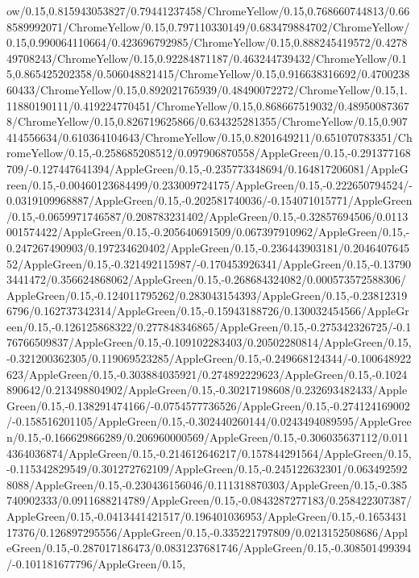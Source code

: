 {\begin{tikzternal}
{ow/0.15,0.815943053827/0.79441237458/ChromeYellow/0.15,0.768660744813/0.668589992071/ChromeYellow/0.15,0.797110330149/0.683479884702/ChromeYellow/0.15,0.990064110664/0.423696792985/ChromeYellow/0.15,0.888245419572/0.427849708243/ChromeYellow/0.15,0.92284871187/0.463244739432/ChromeYellow/0.15,0.865425202358/0.506048821415/ChromeYellow/0.15,0.916638316692/0.470023860433/ChromeYellow/0.15,0.892021765939/0.48490072272/ChromeYellow/0.15,1.11880190111/0.419224770451/ChromeYellow/0.15,0.868667519032/0.489500873678/ChromeYellow/0.15,0.826719625866/0.634325281355/ChromeYellow/0.15,0.907414556634/0.610364104643/ChromeYellow/0.15,0.8201649211/0.651070783351/ChromeYellow/0.15,-0.258685208512/0.097906870558/AppleGreen/0.15,-0.291377168709/-0.127447641394/AppleGreen/0.15,-0.235773348694/0.164817206081/AppleGreen/0.15,-0.00460123684499/0.233009724175/AppleGreen/0.15,-0.222650794524/-0.0319109968887/AppleGreen/0.15,-0.202581740036/-0.154071015771/AppleGreen/0.15,-0.0659971746587/0.208783231402/AppleGreen/0.15,-0.32857694506/0.0113001574422/AppleGreen/0.15,-0.205640691509/0.067397910962/AppleGreen/0.15,-0.247267490903/0.197234620402/AppleGreen/0.15,-0.236443903181/0.204640764552/AppleGreen/0.15,-0.321492115987/-0.170453926341/AppleGreen/0.15,-0.137903441472/0.356624868062/AppleGreen/0.15,-0.268684324082/0.000573572588306/AppleGreen/0.15,-0.124011795262/0.283043154393/AppleGreen/0.15,-0.238123196796/0.162737342314/AppleGreen/0.15,-0.15943188726/0.130032454566/AppleGreen/0.15,-0.126125868322/0.277848346865/AppleGreen/0.15,-0.275342326725/-0.176766509837/AppleGreen/0.15,-0.109102283403/0.20502280814/AppleGreen/0.15,-0.321200362305/0.119069523285/AppleGreen/0.15,-0.249668124344/-0.100648922623/AppleGreen/0.15,-0.303884035921/0.274892229623/AppleGreen/0.15,-0.1024890642/0.213498804902/AppleGreen/0.15,-0.30217198608/0.232693482433/AppleGreen/0.15,-0.138291474166/-0.0754577736526/AppleGreen/0.15,-0.274124169002/-0.158516201105/AppleGreen/0.15,-0.302440260144/0.0243494089595/AppleGreen/0.15,-0.166629866289/0.206960000569/AppleGreen/0.15,-0.306035637112/0.0114364036874/AppleGreen/0.15,-0.214612646217/0.157844291564/AppleGreen/0.15,-0.115342829549/0.301272762109/AppleGreen/0.15,-0.245122632301/0.0634925928088/AppleGreen/0.15,-0.230436156046/0.111318870303/AppleGreen/0.15,-0.385740902333/0.0911688214789/AppleGreen/0.15,-0.0843287277183/0.258422307387/AppleGreen/0.15,-0.0413441421517/0.196401036953/AppleGreen/0.15,-0.165343117376/0.126897295556/AppleGreen/0.15,-0.335221797809/0.0213152508686/AppleGreen/0.15,-0.287017186473/0.0831237681746/AppleGreen/0.15,-0.308501499394/-0.101181677796/AppleGreen/0.15,
}
\end{tikzternal}}
